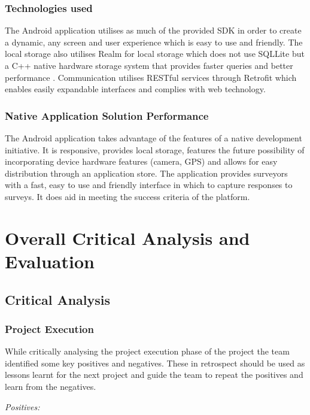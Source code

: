 \documentclass[12pt]{witseiepaper}
\begin{document}
\subsubsection{Technologies used}
The Android application utilises as much of the provided SDK in order to create a dynamic, any screen and user experience which is easy to use and friendly. The local storage also utilises Realm  for local storage which does not use SQLLite but a C++ native hardware storage system that provides faster queries and better performance \cite{RealmPerformance}. Communication utilises RESTful services through Retrofit \cite{retrofit} which enables easily expandable interfaces and complies with web technology.

\subsubsection{Native Application Solution Performance}
The Android application takes advantage of the features of a native development initiative. It is responsive, provides local storage, features the future possibility of incorporating device hardware features (camera, GPS) and allows for easy distribution through an application store. The application provides surveyors with a fast, easy to use and friendly interface in which to capture responses to surveys. It does aid in meeting the success criteria of the platform.

\section{Overall Critical Analysis and Evaluation}

\subsection{Critical Analysis}


\subsubsection{Project Execution}
While critically analysing the project execution phase of the project the team identified some key positives and negatives. These in retrospect should be used as lessons learnt for the next project and guide the team to repeat the positives and learn from the negatives.

\textit{Positives:}
\end{document}
